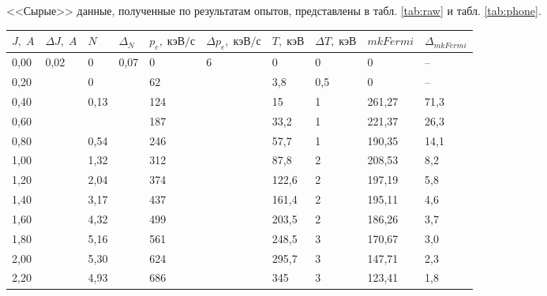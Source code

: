 \documentclass[a4paper]{article}
\begin{document}
	<<Сырые>> данные, полученные по результатам опытов, представлены в табл. \ref{tab:raw} и табл. \ref{tab:phone}.
	
\begin{table}[h]
	\centering
	\begin{tabular}{|l|l|l|l|l|l|l|l|l|l|}
		\hline
		$J, \;A$ &
		$\Delta J, \; A$ &
		$N$ &
		$\Delta_{N}$ &
		$p_e, \;кэВ / с$ &
		$\Delta p_e, \;кэВ/с$ &
		$T, \; кэВ$ &
		$\Delta T, \; кэВ$ &
		$mkFermi$ &
		$\Delta_{mkFermi}$ \\ \hline
		0,00 &
		\multirow{26}{*}{0,02} &
		0 &
		\multirow{26}{*}{0,07} &
		0 &
		\multirow{26}{*}{6} &
		0 &
		0 &
		0 &
		-- \\ \cline{1-1} \cline{3-3} \cline{5-5} \cline{7-10} 
		0,20 &  & 0    &  & 62   &  & 3,8   & 0,5 & 0      & --   \\ \cline{1-1} \cline{3-3} \cline{5-5} \cline{7-10} 
		0,40 &  & 0,13 &  & 124  &  & 15    & 1   & 261,27 & 71,3 \\ \cline{1-1} \cline{3-3} \cline{5-5} \cline{7-10} 
		0,60 &  &      &  & 187  &  & 33,2  & 1   & 221,37 & 26,3 \\ \cline{1-1} \cline{3-3} \cline{5-5} \cline{7-10} 
		0,80 &  & 0,54 &  & 246  &  & 57,7  & 1   & 190,35 & 14,1 \\ \cline{1-1} \cline{3-3} \cline{5-5} \cline{7-10} 
		1,00 &  & 1,32 &  & 312  &  & 87,8  & 2   & 208,53 & 8,2  \\ \cline{1-1} \cline{3-3} \cline{5-5} \cline{7-10} 
		1,20 &  & 2,04 &  & 374  &  & 122,6 & 2   & 197,19 & 5,8  \\ \cline{1-1} \cline{3-3} \cline{5-5} \cline{7-10} 
		1,40 &  & 3,17 &  & 437  &  & 161,4 & 2   & 195,11 & 4,6  \\ \cline{1-1} \cline{3-3} \cline{5-5} \cline{7-10} 
		1,60 &  & 4,32 &  & 499  &  & 203,5 & 2   & 186,26 & 3,7  \\ \cline{1-1} \cline{3-3} \cline{5-5} \cline{7-10} 
		1,80 &  & 5,16 &  & 561  &  & 248,5 & 3   & 170,67 & 3,0  \\ \cline{1-1} \cline{3-3} \cline{5-5} \cline{7-10} 
		2,00 &  & 5,30 &  & 624  &  & 295,7 & 3   & 147,71 & 2,3  \\ \cline{1-1} \cline{3-3} \cline{5-5} \cline{7-10} 
		2,20 &  & 4,93 &  & 686  &  & 345   & 3   & 123,41 & 1,8  \\ \cline{1-1} \cline{3-3} \cline{5-5} \cline{7-10} 

\end{tabular}
\end{table}
\end{document}
